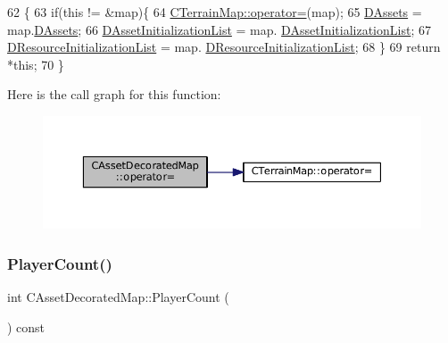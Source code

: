 \begin{DoxyCode}
62                                                                               \{
63     \textcolor{keywordflow}{if}(\textcolor{keyword}{this} != &map)\{
64         \hyperlink{classCTerrainMap_ad9f476d5d4db6de2907dfa3d4d9de7e6}{CTerrainMap::operator=}(map);
65         \hyperlink{classCAssetDecoratedMap_a94eeed5b16141169b1ba6cb3842055aa}{DAssets} = map.\hyperlink{classCAssetDecoratedMap_a94eeed5b16141169b1ba6cb3842055aa}{DAssets};
66         \hyperlink{classCAssetDecoratedMap_a2b7bf2e9a19a9173093cef32048608c2}{DAssetInitializationList} = map.
      \hyperlink{classCAssetDecoratedMap_a2b7bf2e9a19a9173093cef32048608c2}{DAssetInitializationList};
67         \hyperlink{classCAssetDecoratedMap_ab4c78aeb90280ea98a3aa542cdb7f8cc}{DResourceInitializationList} = map.
      \hyperlink{classCAssetDecoratedMap_ab4c78aeb90280ea98a3aa542cdb7f8cc}{DResourceInitializationList};
68     \}
69     \textcolor{keywordflow}{return} *\textcolor{keyword}{this};
70 \}
\end{DoxyCode}
Here is the call graph for this function\+:\nopagebreak
\begin{figure}[H]
\begin{center}
\leavevmode
\includegraphics[width=350pt]{classCAssetDecoratedMap_a0330faaf18f597b5e2ebbbfcd8bf2819_cgraph}
\end{center}
\end{figure}
\hypertarget{classCAssetDecoratedMap_a1ead2938a9585fa82b5b5ef72efe6eba}{}\label{classCAssetDecoratedMap_a1ead2938a9585fa82b5b5ef72efe6eba} 
\subsubsection{\texorpdfstring{Player\+Count()}{PlayerCount()}}
{\footnotesize\ttfamily int C\+Asset\+Decorated\+Map\+::\+Player\+Count (\begin{DoxyParamCaption}{ }\end{DoxyParamCaption}) const\hspace{0.3cm}{\ttfamily [inline]}}




